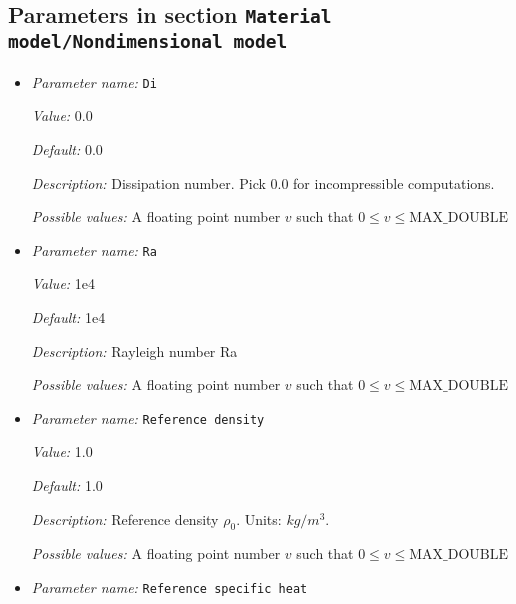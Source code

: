 \subsection{Parameters in section \tt Material model/Nondimensional model}
\label{parameters:Material_20model/Nondimensional_20model}

\begin{itemize}
\item {\it Parameter name:} {\tt Di}
\label{parameters:Material model/Nondimensional model/Di}
\label{parameters:Material_20model/Nondimensional_20model/Di}


{\it Value:} 0.0


{\it Default:} 0.0


{\it Description:} Dissipation number. Pick 0.0 for incompressible computations.


{\it Possible values:} A floating point number $v$ such that $0 \leq v \leq \text{MAX\_DOUBLE}$
\item {\it Parameter name:} {\tt Ra}
\label{parameters:Material model/Nondimensional model/Ra}
\label{parameters:Material_20model/Nondimensional_20model/Ra}


{\it Value:} 1e4


{\it Default:} 1e4


{\it Description:} Rayleigh number Ra


{\it Possible values:} A floating point number $v$ such that $0 \leq v \leq \text{MAX\_DOUBLE}$
\item {\it Parameter name:} {\tt Reference density}
\label{parameters:Material model/Nondimensional model/Reference density}
\label{parameters:Material_20model/Nondimensional_20model/Reference_20density}


{\it Value:} 1.0


{\it Default:} 1.0


{\it Description:} Reference density $\rho_0$. Units: $kg/m^3$.


{\it Possible values:} A floating point number $v$ such that $0 \leq v \leq \text{MAX\_DOUBLE}$
\item {\it Parameter name:} {\tt Reference specific heat}
\label{parameters:Material model/Nondimensional model/Reference specific heat}
\label{parameters:Material_20model/Nondimensional_20model/Reference_20specific_20heat}



\end{itemize}
